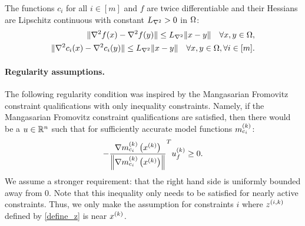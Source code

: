 

\begin{assumption}
\label{lipschitz_hessians_assumption}
The functions $c_i$ for all $i \in [m]$ and $f$ are twice differentiable and their Hessians are Lipschitz continuous with constant ${L_{\nabla^2}} > 0$ in $ \Omega $:
\begin{align*}
\|\nabla^2 f(x) - \nabla^2 f(y)\| \le {L_{\nabla^2}} \|x - y\| \quad \forall x,y \in \Omega, \\
\|\nabla^2 c_i(x) - \nabla^2 c_i(y)\| \le {L_{\nabla^2}} \|x - y\| \quad \forall x,y \in \Omega, \forall i \in [m] .
\end{align*}
\end{assumption}


\paragraph*{Regularity assumptions.}


The following regularity condition was inspired by the Mangasarian Fromovitz constraint qualifications with only inequality constraints.
Namely, if the Mangasarian Fromovitz constraint qualifications are satisfied, then there would be a $u\in\mathbb R^n$ 
such that for sufficiently accurate model functions ${{m}^{(k)}_{c_i}}$:
\begin{align*}
-\frac {{\nabla m_{c_i}^{(k)}\left(x^{(k)}\right)}}{\left\|{\nabla m_{c_i}^{(k)}\left(x^{(k)}\right)}\right\|} ^T{u^{(k)}_f} \ge 0.
\end{align*}
We assume a stronger requirement: that the right hand side is uniformly bounded away from $0$.
Note that this inequality only needs to be satisfied for nearly active constraints.
Thus, we only make the assumption for constraints $i$ where ${z^{(i, k)}}$ defined by \cref{define_z} is near $x^{(k)}$.
% 

